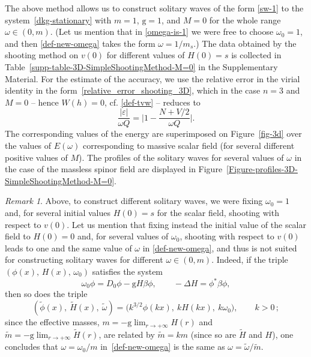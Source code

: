 \documentclass[12pt]{extarticle}
\newcommand{\coupling}{\mathrm{g}}
\newcommand{\abs}[1]{\vert #1 \vert}
\theoremstyle{plain}
\theoremstyle{remark}
\newtheorem{remark}[lemma]{Remark}
\begin{document}
The above method allows us to construct
solitary waves of the form \eqref{sw-1}
to the system~\eqref{dkg-stationary} with 
$m=1$,
$\coupling=1$, and $M=0$ for the whole range $\omega \in (0,m)$.
(Let us mention that in \eqref{omega-is-1}
we were free to choose $\omega_0=1$,
and then \eqref{def-new-omega}
takes the form
$\omega=1/m_s$.)
The data obtained by the shooting method on $v(0)$
for different values of $H(0)=s$
is collected in
Table~\ref{supp-table-3D-SimpleShootingMethod-M=0}
in the Supplementary Material.
For the estimate of the accuracy,
we use the relative error
in the virial identity
in the form~\eqref{relative_error_shooting_3D},
which in the case
$n=3$
and
$M=0$ -- hence $W(h)=0$, cf. \eqref{def-tvw} --
reduces to
\[
\frac{\abs{\varepsilon}}{\omega Q}
=
\bigg\vert
1 -  \frac{N + V/2}{\omega Q}
\bigg\vert.
\]
The corresponding values of the energy
are superimposed on Figure~\ref{fig-3d}
over the values of $E(\omega)$
corresponding to massive scalar field
(for several different positive values of $M$).
The profiles of the solitary waves 
for several values of $\omega$
in the case of the massless spinor
field
are displayed in Figure~\ref{Figure-profiles-3D-SimpleShootingMethod-M=0}.

\begin{remark}
Above, to construct different solitary
waves,
we were fixing $\omega_0=1$
and, for several initial values $H(0)=s$ for the scalar field,
shooting with respect to $v(0)$.
Let us mention that
fixing instead the initial value of the scalar field to $H(0)=0$
and, for several values of $\omega_0$,
shooting with respect to $v(0)$
leads to one and the same
value of $\omega$
in \eqref{def-new-omega},
and thus is not suited for constructing
solitary waves for different $\omega\in(0,m)$.
Indeed,
if the triple
$(\phi(x),\,H(x),\,\omega_0)$
satisfies the system
\[
\omega_0\phi
=
D_0\phi-\coupling H\beta\phi,
\qquad
-\Delta H=\phi^*\beta\phi,
\]
then so does the triple
\[
(\tilde\phi(x),~\tilde H(x),~\tilde\omega)=
\bigl(
k^{3/2}\phi(kx),~k H(kx),~k\omega_0
\bigr),
\qquad
k>0\,;
\]
since the effective masses,
$m=-\coupling\lim_{r\to+\infty}H(r)$
and
$\tilde{m}
=-\coupling\lim_{r\to+\infty}\tilde H(r)$,
are related by
$\tilde{m}=km$
(since so are $\tilde H$ and $H$),
one concludes that
$\omega = \omega_0/m$
in~\eqref{def-new-omega}
is the same as
$\omega=\tilde\omega/\tilde{m}$.
\end{remark}
\end{document}
